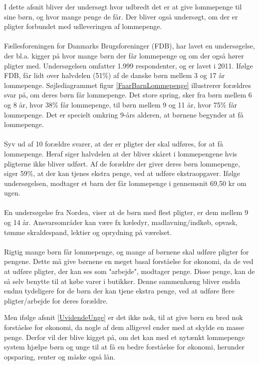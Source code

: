 I dette afsnit bliver der undersøgt hvor udbredt det er at give lommepenge til sine børn, og hvor mange penge de får. Der bliver også undersøgt, om der er pligter forbundet med udleveringen af lommepenge.\\
\\
Fællesforeningen for Danmarks Brugsforeninger (FDB), har lavet en undersøgelse, der bl.a. kigger på hvor mange børn der får lommepenge og om der også hører pligter med. \cite{FDB1} Undersøgelsen omfatter 1.999 respondenter, og er lavet i 2011.
Ifølge FDB, får lidt over halvdelen (51\%) af de danske børn mellem 3 og 17 år lommepenge. Søjlediagrammet figur \ref{FaarBarnLommepenge} illustrerer forældres svar på, om deres børn får lommepenge. Det store spring, sker fra børn mellem 6 og 8 år, hvor 38\% får lommepenge, til børn mellem 9 og 11 år, hvor 75\% får lommepenge. Det er specielt omkring 9-års alderen, at børnene begynder at få lommepenge. \\
\\
Syv ud af 10 forældre svarer, at der er pligter der skal udføres, for at få lommepenge. Heraf siger halvdelen at der bliver skåret i lommepengene hvis pligterne ikke bliver udført. Af de forældre der giver deres børn lommepenge, siger 59\%, at der kan tjenes ekstra penge, ved at udføre ekstraopgaver.
Ifølge undersøgelsen, modtager et barn der får lommepenge i gennemsnit 69,50 kr om ugen.\\
\\
En undersøgelse fra Nordea, viser at de børn med flest pligter, er dem mellem 9 og 14 år. Ansvarsområder kan være fx kæledyr, madlavning/indkøb, opvask, tømme skraldespand, lektier og oprydning på værelset. \cite{Nordea1}\\
\\
Rigtig mange børn får lommepenge, og mange af børnene skal udføre pligter for pengene. Dette må give børnene en meget basal forståelse for økonomi, da de ved at udføre pligter, der kan ses som "arbejde", modtager penge. Disse penge, kan de så selv benytte til at købe varer i butikker. Denne sammenhæng bliver endda endnu tydeligere for de børn der kan tjene ekstra penge, ved at udføre flere pligter/arbejde for deres forældre.

Men ifølge afsnit \ref{UvidendeUnge} er det ikke nok, til at give børn en bred nok forståelse for økonomi, da nogle af dem alligevel ender med at skylde en masse penge. Derfor vil der blive kigget på, om det kan med et nytænkt lommepenge system hjælpe børn og unge til at få en bedre forståelse for økonomi, herunder opsparing, renter og måske også lån.


